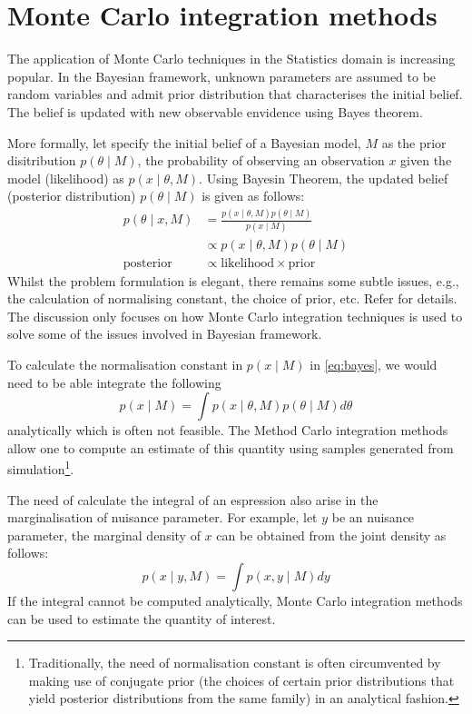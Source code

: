 
\chapter{Monte Carlo integration methods}
\label{ch:mcmethods}
The application of Monte Carlo techniques in the Statistics domain is increasing popular. In the Bayesian framework, unknown parameters are assumed to be random variables and admit prior distribution that characterises the initial belief. The belief is updated with new observable envidence using Bayes theorem.

More formally, let specify the initial belief of a Bayesian model, $M$ as the prior disitribution $p(\theta \mid M)$, the probability of observing an observation $x$ given the model (likelihood) as $p(x \mid \theta, M)$. Using Bayesin Theorem, the updated belief (posterior distribution) $p(\theta \mid M)$ is given as follows:
\begin{align}
  p(\theta \mid x , M) &= \frac{p(x \mid \theta , M) p(\theta \mid M)}{p(x \mid M)} \nonumber \\
                   &\propto p(x \mid \theta , M) p(\theta \mid M) \label{eq:bayes} \\
  \text{posterior} &\propto \text{likelihood} \times \text{prior}
\end{align}
Whilst the problem formulation is elegant, there remains some subtle issues, e.g., the calculation of normalising constant, the choice of prior, etc. Refer \cite{BD12} for details. The discussion only focuses on how Monte Carlo integration techniques is used to solve some of the issues involved in Bayesian framework.

To calculate the normalisation constant in $p(x \mid M)$ in \eqref{eq:bayes}, we would need to be able integrate the following
\begin{equation}
  p(x \mid M) = \int p (x \mid \theta, M)p(\theta \mid M) d\theta
\end{equation}
analytically which is often not feasible. The Method Carlo integration methods allow one to compute an estimate of this quantity using samples generated from simulation\footnote{Traditionally, the need of normalisation constant is often circumvented by making use of conjugate prior (the choices of certain prior distributions that yield posterior distributions from the same family) in an analytical fashion.}.

The need of calculate the integral of an espression also arise in the marginalisation of nuisance parameter. For example, let $y$ be an nuisance parameter, the marginal density of $x$ can be obtained from the joint density as follows:
\begin{equation}
  p(x \mid y, M) = \int p(x, y \mid M) dy
\end{equation}
If the integral cannot be computed analytically, Monte Carlo integration methods can be used to estimate the quantity of interest.

